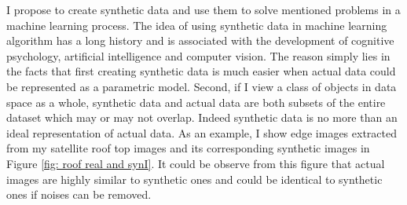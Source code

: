 \documentclass{iitthesis}
\begin{document}
I propose to create synthetic data and use them to solve mentioned problems in a machine learning process. The idea of using synthetic data in machine learning algorithm has a long history and is associated with the development of cognitive psychology, artificial intelligence and computer vision. The reason simply lies in the facts that first creating synthetic data is much easier when actual data could be represented as a parametric model. Second, if I view a class of objects in data space as a whole, synthetic data and actual data are both subsets of the entire dataset which may or may not overlap. Indeed synthetic data is no more than an ideal representation of actual data. As an example, I show edge images extracted from my satellite roof top images and its corresponding synthetic images in Figure \ref{fig: roof real and synI}. It could be observe from this figure that actual images are highly similar to synthetic ones and could be identical to synthetic ones if noises can be removed.

 \label{dataspace: relatedwork}
\end{document}

